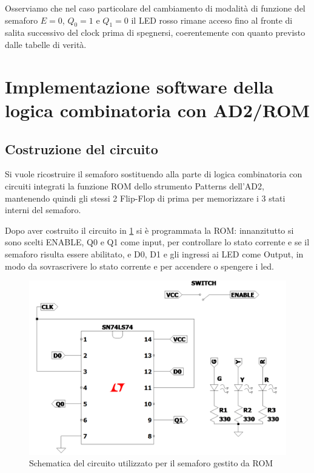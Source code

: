 \documentclass[10pt, a4paper, italian]{article}
\begin{document}
Osserviamo che nel caso particolare del cambiamento di modalità di funzione
del semaforo $E = 0$, $Q_0 = 1$ e $Q_1 = 0$ il LED rosso rimane acceso fino al
fronte di salita successivo del clock prima di spegnersi, coerentemente con
quanto previsto dalle tabelle di verità.

\section{Implementazione software della logica combinatoria con AD2/ROM}
\subsection{Costruzione del circuito}
Si vuole ricostruire il semaforo sostituendo alla parte di logica
combinatoria con circuiti integrati la funzione ROM dello strumento Patterns
dell'AD2, mantenendo quindi gli stessi 2 Flip-Flop di prima per memorizzare i
3 stati interni del semaforo.

Dopo aver costruito il circuito in \cref{schem: rom} si è programmata la ROM:
innanzitutto si sono scelti ENABLE, Q0 e Q1 come input, per controllare lo stato corrente e se il semaforo risulta essere abilitato, e D0, D1 e gli ingressi ai LED come Output, in modo da sovrascrivere lo stato corrente e per accendere o spengere i led.
\begin{figure}[htbp]
    \centering
    \includegraphics[width=\textwidth]{schem_rom}
    \caption{Schematica del circuito utilizzato per il semaforo gestito da ROM
    \label{schem: rom}}
\end{figure}
\end{document}
